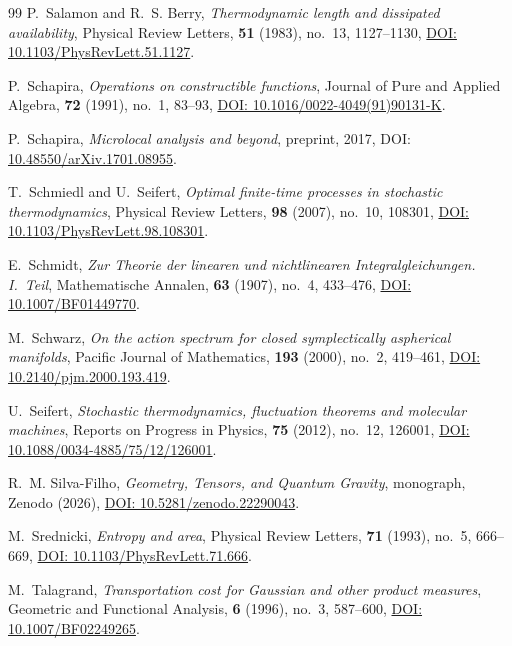 \documentclass[11pt,a4paper,reqno]{amsart}
\theoremstyle{definition}
\theoremstyle{remark}
\numberwithin{equation}{section}
\begin{document}
\begin{thebibliography}{99}
P.~Salamon and R.~S. Berry,
\emph{Thermodynamic length and dissipated availability},
Physical Review Letters, \textbf{51} (1983), no.~13, 1127--1130,
\href{https://doi.org/10.1103/PhysRevLett.51.1127}{DOI: 10.1103/PhysRevLett.51.1127}.

P.~Schapira,
\emph{Operations on constructible functions},
Journal of Pure and Applied Algebra, \textbf{72} (1991), no.~1, 83--93,
\href{https://doi.org/10.1016/0022-4049(91)90131-K}{DOI: 10.1016/0022-4049(91)90131-K}.

P.~Schapira,
\emph{Microlocal analysis and beyond},
preprint, 2017, DOI:
\href{https://doi.org/10.48550/arXiv.1701.08955}{10.48550/arXiv.1701.08955}.

T.~Schmiedl and U.~Seifert,
\emph{Optimal finite-time processes in stochastic thermodynamics},
Physical Review Letters, \textbf{98} (2007), no.~10, 108301,
\href{https://doi.org/10.1103/PhysRevLett.98.108301}{DOI: 10.1103/PhysRevLett.98.108301}.

E.~Schmidt,
\emph{Zur Theorie der linearen und nichtlinearen Integralgleichungen. I.~Teil},
Mathematische Annalen, \textbf{63} (1907), no.~4, 433--476,
\href{https://doi.org/10.1007/BF01449770}{DOI: 10.1007/BF01449770}.

M.~Schwarz,
\emph{On the action spectrum for closed symplectically aspherical manifolds},
Pacific Journal of Mathematics, \textbf{193} (2000), no.~2, 419--461,
\href{https://doi.org/10.2140/pjm.2000.193.419}{DOI: 10.2140/pjm.2000.193.419}.

U.~Seifert,
\emph{Stochastic thermodynamics, fluctuation theorems and molecular machines},
Reports on Progress in Physics, \textbf{75} (2012), no.~12, 126001,
\href{https://doi.org/10.1088/0034-4885/75/12/126001}{DOI: 10.1088/0034-4885/75/12/126001}.

R.~M. Silva-Filho,
\emph{Geometry, Tensors, and Quantum Gravity},
monograph, Zenodo (2026),
\href{https://doi.org/10.5281/zenodo.22290043}{DOI: 10.5281/zenodo.22290043}.

M.~Srednicki,
\emph{Entropy and area},
Physical Review Letters, \textbf{71} (1993), no.~5, 666--669,
\href{https://doi.org/10.1103/PhysRevLett.71.666}{DOI: 10.1103/PhysRevLett.71.666}.

M.~Talagrand,
\emph{Transportation cost for Gaussian and other product measures},
Geometric and Functional Analysis, \textbf{6} (1996), no.~3, 587--600,
\href{https://doi.org/10.1007/BF02249265}{DOI: 10.1007/BF02249265}.


\end{thebibliography}
\end{document}
